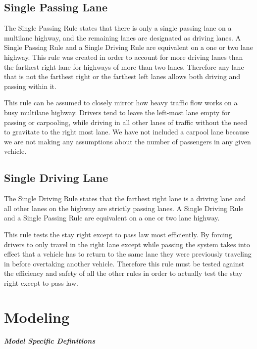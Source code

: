 \documentclass{amsart}
\begin{document}
	\subsection{Single Passing Lane}
	The Single Passing Rule states that there is only a single passing lane on a multilane highway, and the remaining lanes are designated as driving lanes. A Single Passing Rule and a Single Driving Rule are equivalent on a one or two lane highway. This rule was created in order to account for more driving lanes than the farthest right lane for highways of more than two lanes. Therefore any lane that is not the farthest right or the farthest left lanes allows both driving and passing within it. 
	
	This rule can be assumed to closely mirror how heavy traffic flow works on a busy multilane highway. Drivers tend to leave the left-most lane empty for passing or carpooling, while driving in all other lanes of traffic without the need to gravitate to the right most lane. We have not included a carpool lane because we are not making any assumptions about the number of passengers in any given vehicle.
	
	\subsection{Single Driving Lane}
	The Single Driving Rule states that the farthest right lane is a driving lane and all other lanes on the highway are strictly passing lanes. A Single Driving Rule and a Single Passing Rule are equivalent on a one or two lane highway. 

	This rule tests the stay right except to pass law most efficiently. By forcing drivers to only travel in the right lane except while passing the system takes into effect that a vehicle has to return to the same lane they were previously traveling in before overtaking another vehicle. Therefore this rule must be tested against the efficiency and safety of all the other rules in order to actually test the stay right except to pass law. 

\section{\bfseries{Modeling}}

\textit{\textbf{Model Specific Definitions}}
\end{document}
